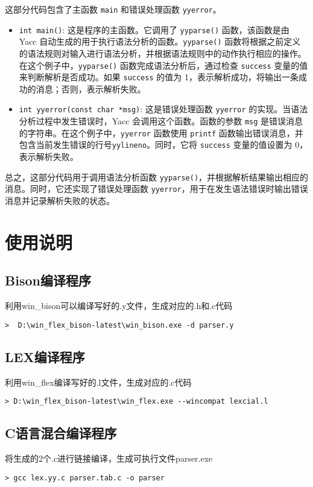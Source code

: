 \documentclass[lang=cn,11pt,a4paper]{elegantpaper}
\begin{document}
这部分代码包含了主函数 \lstinline{main} 和错误处理函数 \lstinline{yyerror}。
\begin{itemize}
    \item \lstinline{int main()}: 这是程序的主函数。它调用了 \lstinline{yyparse()} 函数，该函数是由 Yacc 自动生成的用于执行语法分析的函数。\lstinline{yyparse()} 函数将根据之前定义的语法规则对输入进行语法分析，并根据语法规则中的动作执行相应的操作。在这个例子中，\lstinline{yyparse()} 函数完成语法分析后，通过检查 \lstinline{success} 变量的值来判断解析是否成功。如果 \lstinline{success} 的值为 1，表示解析成功，将输出一条成功的消息；否则，表示解析失败。

    \item \lstinline{int yyerror(const char *msg)}: 这是错误处理函数 \lstinline{yyerror} 的实现。当语法分析过程中发生错误时，Yacc 会调用这个函数。函数的参数 \lstinline{msg} 是错误消息的字符串。在这个例子中，\lstinline{yyerror} 函数使用 \lstinline{printf} 函数输出错误消息，并包含当前发生错误的行号\lstinline{yylineno}。同时，它将 \lstinline{success} 变量的值设置为 0，表示解析失败。
\end{itemize}


总之，这部分代码用于调用语法分析函数 \lstinline{yyparse()}，并根据解析结果输出相应的消息。同时，它还实现了错误处理函数 \lstinline{yyerror}，用于在发生语法错误时输出错误消息并记录解析失败的状态。

\section{使用说明}

\subsection{Bison编译程序}
利用win\_bison可以编译写好的.y文件，生成对应的.h和.c代码
\begin{lstlisting}
>  D:\win_flex_bison-latest\win_bison.exe -d parser.y    
\end{lstlisting}

\subsection{LEX编译程序}
利用win\_flex编译写好的.l文件，生成对应的.c代码
\begin{lstlisting}
> D:\win_flex_bison-latest\win_flex.exe --wincompat lexcial.l
\end{lstlisting}

\subsection{C语言混合编译程序}
将生成的2个.c进行链接编译，生成可执行文件parser.exe
\begin{lstlisting}
> gcc lex.yy.c parser.tab.c -o parser
\end{lstlisting}
\end{document}
